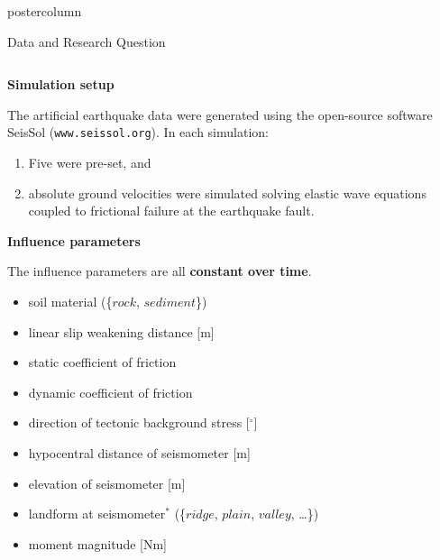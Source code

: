 \documentclass[final,hyperref={pdfpagelabels=false}]{beamer}
\newcommand{\bfGreen}[1]{\textcolor{koalablue}{\textbf{#1}}}
\begin{document}
\begin{frame}
\begin{columns}
\begin{column}{1\textwidth}
\begin{beamercolorbox}[center,wd=\textwidth]{postercolumn}
\begin{minipage}[T]{.95\textwidth}
\begin{block}{\footnotesize Data and Research Question}
\begin{columns}[t]
  \begin{column}{.35\textwidth}
  \vspace{-3ex}
  \begin{center}
  \bfGreen{Simulation setup}
  \end{center}
   The artificial earthquake data were generated using the open-source software SeisSol (\texttt{www.seissol.org}). In each simulation:
  \begin{enumerate}
    \item Five  were pre-set, and
    \item absolute ground velocities were simulated solving elastic wave equations coupled to frictional failure at the earthquake fault.
  \end{enumerate}
  \vspace{2ex}
  \begin{center}
  \bfGreen{Influence parameters}
  \end{center}
  The influence parameters are all \bfGreen{constant over time}.
  \hspace{-2pt}
  \begin{tcolorbox}[colframe=chocolate4,colback=verylightgray,boxrule=2pt,arc=4pt,
  left=-5pt]
  \begin{itemize} \footnotesize
    \item soil material (\{$rock$, $sediment$\})
    \item linear slip weakening distance [m]
    \item static coefficient of friction
    \item dynamic coefficient of friction
    \item direction of tectonic background stress [$^\circ$]
  \end{itemize}
  \end{tcolorbox}
  \vspace{-10px}
  \begin{itemize} \footnotesize
    \item hypocentral distance of seismometer [m]
    \item elevation of seismometer [m]
    \item landform at seismometer$^\ast$ (\{$ridge$, $plain$, $valley$, \ldots\})
    \item moment magnitude [Nm]
  \end{itemize}
  \vspace{1ex}

\end{column}
\end{columns}
\end{block}
\end{minipage}
\end{beamercolorbox}
\end{column}
\end{columns}
\end{frame}
\end{document}
